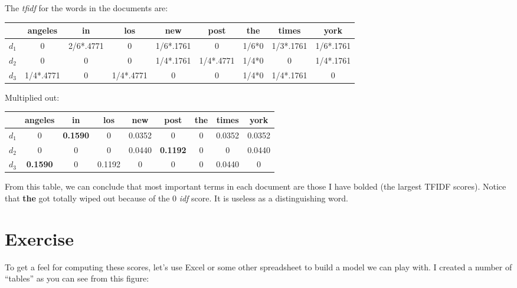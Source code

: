 \documentclass[10pt]{article}
\begin{document}
The {\em tfidf} for the words in the documents are:

\begin{table}[H]
\begin{center}
\begin{footnotesize}
\begin{tabular}{c|c|c|c|c|c|c|c|c}
 & angeles & in & los & new & post & the & times & york\\
\hline
$d_1$ & 0 & 2/6*.4771 & 0 & 1/6*.1761 & 0 & 1/6*0 & 1/3*.1761 & 1/6*.1761\\
$d_2$ & 0 & 0 & 0 & 1/4*.1761 & 1/4*.4771 & 1/4*0 & 0 & 1/4*.1761\\
$d_3$ & 1/4*.4771 & 0 & 1/4*.4771 & 0 & 0 & 1/4*0 & 1/4*.1761 & 0\\
\end{tabular}
\end{footnotesize}
\end{center}
\end{table}%

\noindent Multiplied out:
 
 \begin{table}[H]
\begin{center}
\begin{tabular}{c|c|c|c|c|c|c|c|c}
 & angeles & in & los & new & post & the & times & york\\
\hline
$d_1$ & 0 & {\bf 0.1590} & 0 & 0.0352 & 0 & 0 & 0.0352 & 0.0352 \\
$d_2$ & 0 & 0 & 0 & 0.0440 & {\bf 0.1192} & 0 & 0 & 0.0440\\
$d_3$ & {\bf 0.1590} & 0 & 0.1192 & 0 & 0 & 0 & 0.0440 & 0\\
\end{tabular}
\end{center}
\label{default}
\end{table}%

From this table, we can conclude that most important terms in each document are those I have bolded (the largest TFIDF scores). Notice that {\bf the} got totally wiped out because of the 0 {\em idf} score. It is useless as a distinguishing word.

\section{Exercise}


To get a feel for computing these scores, let's use Excel or some other spreadsheet to build a model we can play with. I created a number of ``tables'' as you can see from this figure:
\end{document}
